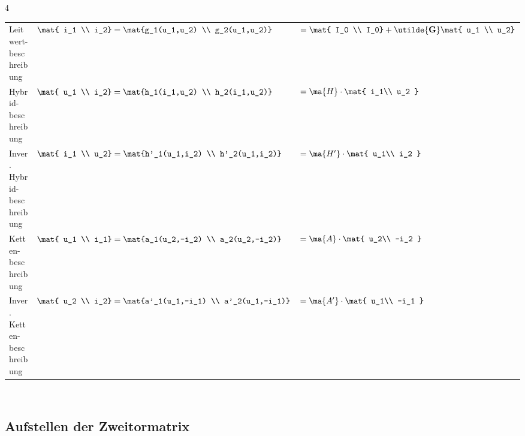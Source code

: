 \documentclass[fs, footer]{latex4ei}
\begin{document}
\begin{multicols*}{4}
\begin{tabular}{@{}p{1.3cm}|ll@{}}
        Leitwert-beschreibung       & $\mat{ i_1                                                                                                                                                                     \\ i_2} = \mat{g_1(u_1,u_2) \\ g_2(u_1,u_2)}$ & $= \mat{ I_0 \\ I_0} + \utilde{ \bf G} \mat{ u_1 \\ u_2} $ \\ \mrule
        Hybrid-beschreibung         & $\mat{ u_1                                                                                                                                                                     \\ i_2} = \mat{h_1(i_1,u_2) \\ h_2(i_1,u_2)} $ & $= \ma{H} \cdot \mat{ i_1\\ u_2 }$\\ \mrule
        Inver. Hybrid- beschreibung & $\mat{ i_1                                                                                                                                                                     \\ u_2} = \mat{h'_1(u_1,i_2) \\ h'_2(u_1,i_2)}$ & $= \ma{H'} \cdot \mat{ u_1\\ i_2 }$ \\ \mrule
        Ketten-beschreibung         & $\mat{ u_1                                                                                                                                                                     \\ i_1} = \mat{a_1(u_2,-i_2) \\ a_2(u_2,-i_2)}$ & $= \ma{A} \cdot \mat{ u_2\\ -i_2 }$\\ \mrule
        Inver. Ketten- beschreibung & $\mat{ u_2                                                                                                                                                                     \\ i_2} = \mat{a'_1(u_1,-i_1) \\ a'_2(u_1,-i_1)}$ &  $= \ma{A'} \cdot \mat{ u_1\\ -i_1 }$
    \end{tabular}\\

    \subsection{Aufstellen der Zweitormatrix}

\end{multicols*}
\end{document}

